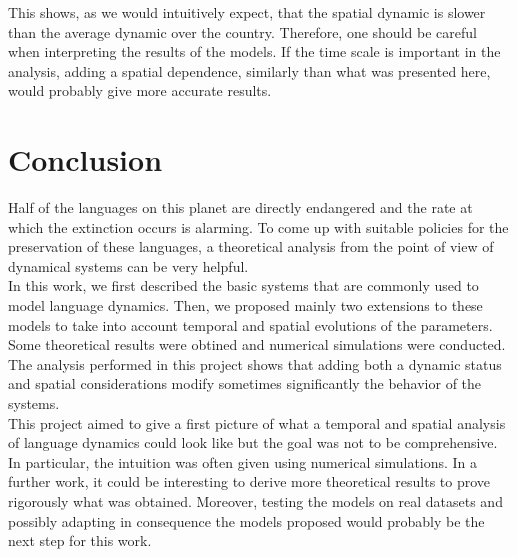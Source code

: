 \documentclass{article}
\begin{document}
This shows, as we would intuitively expect, that the spatial dynamic is slower than the average dynamic over the country.
Therefore, one should be careful when interpreting the results of the models.
If the time scale is important in the analysis, adding a spatial dependence, similarly than what was presented here, would probably give more accurate results.

\section{Conclusion}
\label{sec:conclusion}
Half of the languages on this planet are directly endangered and the rate at which the extinction occurs is alarming.
To come up with suitable policies for the preservation of these languages, a theoretical analysis from the point of view of dynamical systems can be very helpful. \\
In this work, we first described the basic systems that are commonly used to model language dynamics.
Then, we proposed mainly two extensions to these models to take into account temporal and spatial evolutions of the parameters.
Some theoretical results were obtined and numerical simulations were conducted. \\
The analysis performed in this project shows that adding both a dynamic status and spatial considerations modify sometimes significantly the behavior of the systems. \\
This project aimed to give a first picture of what a temporal and spatial analysis of language dynamics could look like but the goal was not to be comprehensive. In particular, the intuition was often given using numerical simulations. In a further work, it could be interesting to derive more theoretical results to prove rigorously what was obtained. Moreover, testing the models on real datasets and possibly adapting in consequence the models proposed would probably be the next step for this work.




\end{document}
